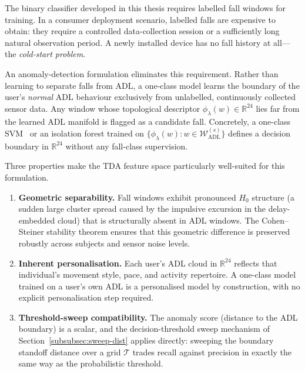 \documentclass[onluarkali,ingilizce,yukseklisans,karton,LisansustuEgitim]{itutez}
\providecommand{\R}{\mathbb{R}}
\providecommand{\1}{\mathbf{1}}
\begin{document}
The binary classifier developed in this thesis requires labelled fall windows for
training.  In a consumer deployment scenario, labelled falls are expensive to obtain:
they require a controlled data-collection session or a sufficiently long natural
observation period.  A newly installed device has no fall history at all---the
\emph{cold-start problem}.

An anomaly-detection formulation eliminates this requirement.  Rather than learning to
separate falls from ADL, a one-class model learns the boundary of the user's
\emph{normal} ADL behaviour exclusively from unlabelled, continuously collected sensor
data.  Any window whose topological descriptor $\phi_\lambda(w)\in\R^{24}$ lies far
from the learned ADL manifold is flagged as a candidate fall.  Concretely, a
one-class SVM~\parencite{scholkopf2001estimating} or an isolation forest trained on
$\{\phi_\lambda(w)\colon w\in\mathcal{W}_{\mathrm{ADL}}^{(s)}\}$ defines a
decision boundary in $\R^{24}$ without any fall-class supervision.

Three properties make the TDA feature space particularly well-suited for this
formulation.

\begin{enumerate}
\item \textbf{Geometric separability.}  Fall windows exhibit pronounced $H_0$
  structure (a sudden large cluster spread caused by the impulsive excursion in the
  delay-embedded cloud) that is structurally absent in ADL windows.  The Cohen--Steiner
  stability theorem ensures that this geometric difference is preserved robustly
  across subjects and sensor noise levels.

\item \textbf{Inherent personalisation.}  Each user's ADL cloud in $\R^{24}$ reflects
  that individual's movement style, pace, and activity repertoire.  A one-class model
  trained on a user's own ADL is a personalised model by construction, with no explicit
  personalisation step required.

\item \textbf{Threshold-sweep compatibility.}  The anomaly score (distance to the ADL
  boundary) is a scalar, and the decision-threshold sweep mechanism of
  Section~\ref{subsubsec:sweep-dist} applies directly: sweeping the boundary standoff
  distance over a grid $\mathcal{T}$ trades recall against precision in exactly the
  same way as the probabilistic threshold.
\end{enumerate}
\end{document}
